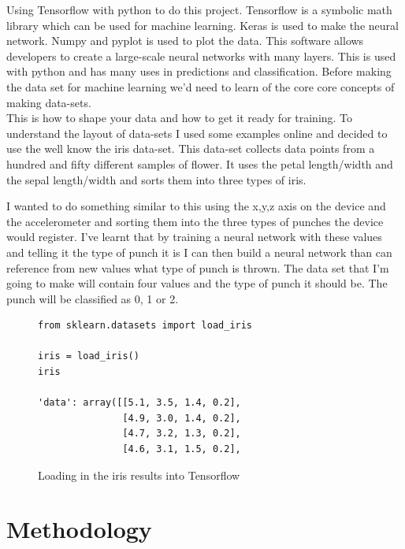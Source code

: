 \documentclass[a4paper,12pt]{report}
\begin{document}
Using Tensorflow with python to do this project. Tensorflow is a symbolic math library which can be used for machine learning. Keras is used to make the neural network. Numpy and pyplot is used to plot the data. This software allows developers to create a large-scale neural networks with many layers. This is used with python and has many uses in predictions and classification. Before making the data set for machine learning we'd need to learn of the core core concepts of making data-sets.\\This is how to shape your data and how to get it ready for training. To understand the layout of data-sets I used some examples online and decided to use the well know the iris data-set. This data-set collects data points from a hundred and fifty different samples of flower. It uses the petal length/width and the sepal length/width and sorts them into three types of iris.

I wanted to do something similar to this using the x,y,z axis on the device and the accelerometer and sorting them into the three types of punches the device would register. I've learnt that by training a neural network with these values and telling it the type of punch it is I can then build a neural network than can reference from new values what type of punch is thrown. The data set that I'm going to make will contain four values and the type of punch it should be. The punch will be classified as 0, 1 or 2.
\newline
\begin{figure}[h]
\begin{verbatim}
from sklearn.datasets import load_iris

iris = load_iris()
iris

'data': array([[5.1, 3.5, 1.4, 0.2],
               [4.9, 3.0, 1.4, 0.2],
               [4.7, 3.2, 1.3, 0.2],
               [4.6, 3.1, 1.5, 0.2],
\end{verbatim}
\caption{Loading in the iris results into Tensorflow}
\label{fig:iris}
\end{figure}

\chapter{Methodology}
\end{document}
